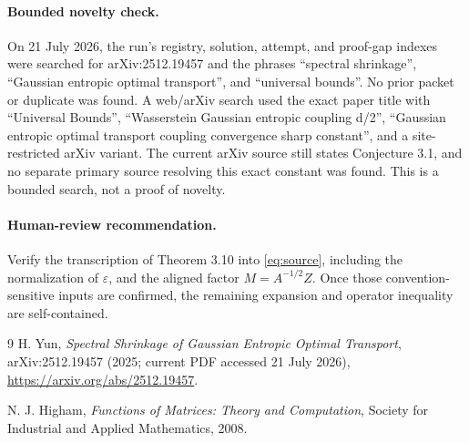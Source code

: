 \documentclass[11pt]{article}
\begin{document}
\paragraph{Bounded novelty check.}
On 21 July 2026, the run's registry, solution, attempt, and proof-gap indexes
were searched for arXiv:2512.19457 and the phrases ``spectral shrinkage'',
``Gaussian entropic optimal transport'', and ``universal bounds''.  No prior
packet or duplicate was found.  A web/arXiv search used the exact paper title
with ``Universal Bounds'', ``Wasserstein Gaussian entropic coupling d/2'',
``Gaussian entropic optimal transport coupling convergence sharp constant'',
and a site-restricted arXiv variant.  The current arXiv source still states
Conjecture 3.1, and no separate primary source resolving this exact constant
was found.  This is a bounded search, not a proof of novelty.

\paragraph{Human-review recommendation.}
Verify the transcription of Theorem 3.10 into \eqref{eq:source}, including the
normalization of $\varepsilon$, and the aligned factor
$M=A^{-1/2}Z$.  Once those convention-sensitive inputs are confirmed, the
remaining expansion and operator inequality are self-contained.

\begin{thebibliography}{9}
H. Yun,
\emph{Spectral Shrinkage of Gaussian Entropic Optimal Transport},
arXiv:2512.19457 (2025; current PDF accessed 21 July 2026),
\url{https://arxiv.org/abs/2512.19457}.

N. J. Higham,
\emph{Functions of Matrices: Theory and Computation},
Society for Industrial and Applied Mathematics, 2008.
\end{thebibliography}
\end{document}
